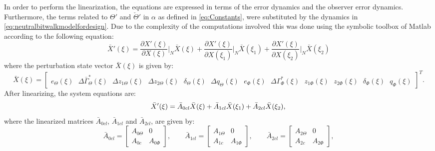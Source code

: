 \documentclass[../main.tex]{subfiles}
\begin{document}
	In order to perform the linearization, the equations are expressed in terms of the error dynamics and the observer error dynamics. Furthermore, the terms related to $\Theta'$ and $\check{\Theta}'$ in $\alpha$ as defined in \eqref{eq:Constants}, were substituted by the dynamics in \eqref{eq:neutralbitwalkmodelfordesign}. Due to the complexity of the computations involved this was done using the symbolic toolbox of Matlab according to the following equation:
	\begin{equation}
	\bar{X}'(\xi) =	\frac{\partial X'(\xi)}{\partial X(\xi)} \bigg|_N \bar{X}(\xi)
					+ \frac{\partial X'(\xi)}{\partial X(\xi_1)} \bigg|_N \bar{X}(\xi_1) + \frac{\partial X'(\xi)}{\partial X(\xi_2)} \bigg|_N \bar{X}(\xi_2)
	\label{eq:linearization}
	\end{equation}	
	where the perturbation state vector $\bar{X}(\xi)$ is given by:
	\begin{equation}
	\bar{X}(\xi) = \begin{bmatrix} 
	e_{\Theta}(\xi) \text{ }\Delta \bar{\Gamma}_\Theta^{*}(\xi) \text{ }\Delta z_{1\Theta}(\xi) \text{ }\Delta z_{2\Theta}(\xi) \text{ }\delta_{\Theta}(\xi) \text{ }\Delta q_\Theta(\xi) \text{ }e_{\Phi}(\xi) \text{ }\Delta \Gamma_\Phi^*(\xi) \text{ }z_{1\Phi}(\xi) \text{ }z_{2\Phi}(\xi) \text{ }\delta_{\Phi}(\xi) \text{ }q_\Phi(\xi)  \nonumber
	\end{bmatrix}^T. \label{eq:PerturbationVector}
	\end{equation}
	After linearizing, the system equations are:	
	\begin{equation}
	\bar{X}'(\xi) =	\bar{A}_{0cl}\bar{X}(\xi) + \bar{A}_{1cl}\bar{X}(\xi_1) + \bar{A}_{2cl} \bar{X}(\xi_2),\\
	\label{eq:totaldynamicslinears}
	\end{equation}	
	where the linearized matrices $\bar{A}_{0cl}$, $\bar{A}_{1cl}$ and $\bar{A}_{2cl}$, are given by:
	\begin{equation}
		\bar{A}_{0cl} = 
		\begin{bmatrix}
			A_{0\Theta} & 0 \\
			A_{0c} & A_{0\Phi}
		\end{bmatrix}, \qquad
		\bar{A}_{1cl} =
		\begin{bmatrix}
			A_{1\Theta} & 0 \\
			A_{1c} & A_{1\Phi}
		\end{bmatrix}, \qquad
		\bar{A}_{2cl} =
		\begin{bmatrix}
			A_{2\Theta} & 0 \\
			A_{2c} & A_{2\Phi} 
		\end{bmatrix}, \label{eq:LinearMatrices}
	\end{equation}
\end{document}
